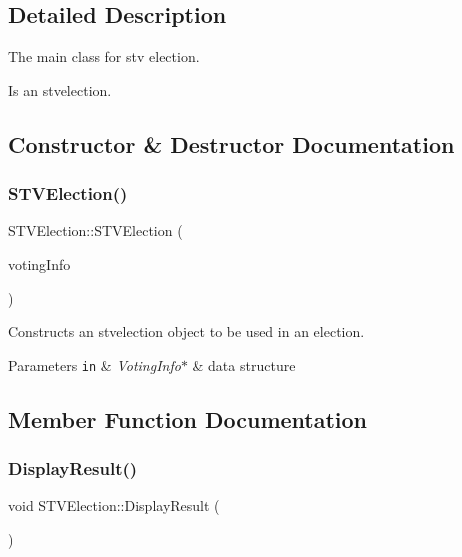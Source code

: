 \subsection{Detailed Description}
The main class for stv election. 

Is an stvelection. 

\subsection{Constructor \& Destructor Documentation}
\mbox{\label{classSTVElection_a6abe30e81059242a53f0c06c29331d10}} 
\subsubsection{\texorpdfstring{S\+T\+V\+Election()}{STVElection()}}
{\footnotesize\ttfamily S\+T\+V\+Election\+::\+S\+T\+V\+Election (\begin{DoxyParamCaption}\item[{\hyperlink{classVotingInfo}{Voting\+Info} $\ast$}]{voting\+Info }\end{DoxyParamCaption})\hspace{0.3cm}{\ttfamily [explicit]}}



Constructs an stvelection object to be used in an election. 


\begin{DoxyParams}[1]{Parameters}
\mbox{\tt in}  & {\em Voting\+Info$\ast$} & data structure \\
\hline
\end{DoxyParams}


\subsection{Member Function Documentation}
\mbox{\label{classSTVElection_a224ba2c99b4dbd2f4bbce4de8b1e98f4}} 
\subsubsection{\texorpdfstring{Display\+Result()}{DisplayResult()}}
{\footnotesize\ttfamily void S\+T\+V\+Election\+::\+Display\+Result (\begin{DoxyParamCaption}{ }\end{DoxyParamCaption})}



